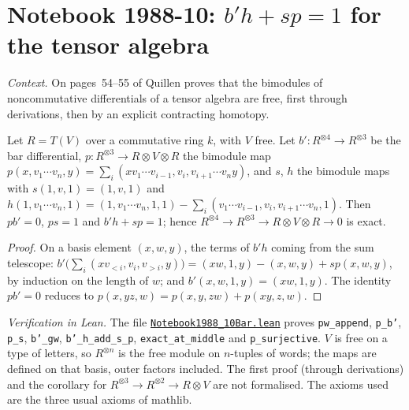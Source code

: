 \section[Notebook 1988-10: the contracting homotopy for T(V)]{Notebook 1988-10: $b'h + sp = 1$ for the tensor algebra\protect{}}\label{sec:quillen-1988-10-bar}

\emph{Context.} On pages~54--55 of  Quillen proves that the bimodules of noncommutative differentials of a tensor algebra are free, first through derivations, then by an explicit contracting homotopy.

\begin{encadre}
\begin{theoreme}\label{thm:quillen-1988-10-bar}
Let $R = T(V)$ over a commutative ring $k$, with $V$ free. Let $b' : R^{\otimes 4} \to R^{\otimes 3}$ be the bar differential, $p : R^{\otimes 3} \to R \otimes V \otimes R$ the bimodule map $p(x, v_1\cdots v_n, y) = \sum_i(xv_1\cdots v_{i-1}, v_i, v_{i+1}\cdots v_ny)$, and $s$, $h$ the bimodule maps with $s(1, v, 1) = (1, v, 1)$ and $h(1, v_1\cdots v_n, 1) = (1, v_1\cdots v_n, 1, 1) - \sum_i(v_1\cdots v_{i-1}, v_i, v_{i+1}\cdots v_n, 1)$. Then $pb' = 0$, $ps = 1$ and $b'h + sp = 1$; hence $R^{\otimes 4} \to R^{\otimes 3} \to R \otimes V \otimes R \to 0$ is exact.
\end{theoreme}
\end{encadre}

\begin{proof}
On a basis element $(x, w, y)$, the terms of $b'h$ coming from the sum telescope: $b'\bigl(\sum_i(xv_{<i}, v_i, v_{>i}, y)\bigr) = (xw, 1, y) - (x, w, y) + sp(x, w, y)$, by induction on the length of $w$; and $b'(x, w, 1, y) = (xw, 1, y)$. The identity $pb' = 0$ reduces to $p(x, yz, w) = p(x, y, zw) + p(xy, z, w)$.
\end{proof}

\emph{Verification in Lean.} The file \href{\leanblobmain/Notebook1988_10Bar.lean}{\texttt{Notebook1988\_10Bar.\allowbreak{}lean}} proves \texttt{pw\_append}, \texttt{p\_b'}, \texttt{p\_s}, \texttt{b'\_gw}, \texttt{b'\_h\_add\_s\_p}, \texttt{exact\_at\_middle} and \texttt{p\_surjective}. $V$ is free on a type of letters, so $R^{\otimes n}$ is the free module on $n$-tuples of words; the maps are defined on that basis, outer factors included. The first proof (through derivations) and the corollary for $R^{\otimes 3} \to R^{\otimes 2} \to R \otimes V$ are not formalised. The axioms used are the three usual axioms of mathlib.

